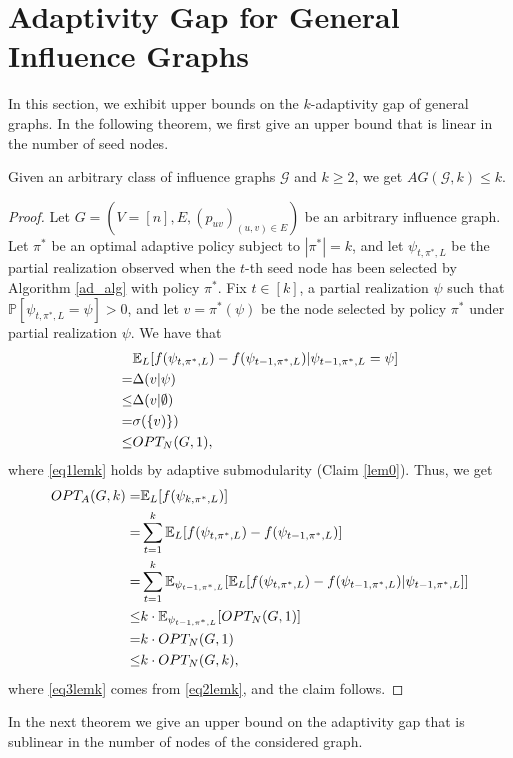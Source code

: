\section{Adaptivity Gap for General Influence  Graphs}\label{sec_gen}
In this section, we exhibit upper bounds on the $k$-adaptivity gap of general graphs. In the following theorem, we first give an upper bound that is linear in the number of seed nodes.
\begin{theorem}\label{lemk}
Given an arbitrary class of influence graphs $\mathcal{G}$ and $k\geq 2$, we get $AG(\mathcal{G},k)\leq k$. 
\end{theorem}
\begin{proof}
Let $G=(V=[n],E,(p_{uv})_{(u,v)\in E})$ be an arbitrary influence graph. Let $\pi^*$ be an optimal adaptive policy subject to $|\pi^*|=k$, and let $\psi_{t,\pi^*,L}$ be the partial realization observed when the $t$-th seed node has been selected by Algorithm \ref{ad_alg} with policy $\pi^*$. Fix $t\in [k]$, a partial realization $\psi$ such that $\mathbb{P}[\psi_{t,\pi^*,L}=\psi]>0$, and let $v=\pi^*(\psi)$ be the node selected by policy $\pi^*$ under partial realization $\psi$. We have that
\begin{align}
&\mathbb{E}_{L}[f(\psi_{t,\pi^*,L})-f(\psi_{t-1,\pi^*,L})|\psi_{t-1,\pi^*,L}=\psi]\nonumber\\
=&\Delta(v|\psi)\nonumber\\
\leq & \Delta(v|\emptyset)\label{eq1lemk}\\
=&\sigma(\{v)\})\nonumber\\
\leq & OPT_N(G,1),\label{eq2lemk}
\end{align}
where \eqref{eq1lemk} holds by adaptive submodularity (Claim  \ref{lem0}). Thus, we get
\begin{align}
OPT_A(G,k)=&\mathbb{E}_{L}[f(\psi_{k,\pi^*,L})]\nonumber\\
=&\sum_{t=1}^k \mathbb{E}_{L}[f(\psi_{t,\pi^*,L})-f(\psi_{t-1,\pi^*,L})]\nonumber\\
=&\sum_{t=1}^k \mathbb{E}_{\psi_{t-1,\pi^*,L}}[\mathbb{E}_L[f(\psi_{t,\pi^*,L})-f(\psi_{t-1,\pi^*,L})|\psi_{t-1,\pi^*,L}]]\nonumber\\
\leq &k\cdot\mathbb{E}_{\psi_{t-1,\pi^*,L}}[OPT_N(G,1)]\label{eq3lemk}\\
=&k\cdot OPT_N(G,1)\nonumber\\
\leq &k\cdot OPT_N(G,k),
\end{align}
where \eqref{eq3lemk} comes from \eqref{eq2lemk}, and the claim follows.
\end{proof}
In the next theorem we give an upper bound on the adaptivity gap that is sublinear in the number of nodes of the considered graph.

